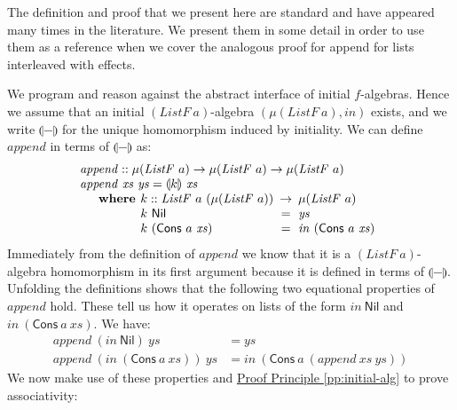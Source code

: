 \documentclass{jfp1}
\newcommand{\fold}[1]{\llparenthesis #1 \rrparenthesis}
\newcommand{\proofprinref}[1]{\hyperref[#1]{Proof Principle \ref*{#1}}}
\newcommand{\kw}[1]{\textbf{#1}}
\begin{document}
The definition and proof that we present here are standard and have
appeared many times in the literature. We present them in some detail
in order to use them as a reference when we cover the analogous proof
for append for lists interleaved with effects.

We program and reason against the abstract interface of initial
$f$-algebras. Hence we assume that an initial
$(\mathit{ListF}~a)$-algebra $(\mu(\mathit{ListF}~a), \mathit{in})$
exists, and we write $\fold{-}$ for the unique homomorphism induced by
initiality. We can define $\mathit{append}$ in terms of $\fold{-}$ as:
\begin{displaymath}
  \begin{array}{l}
    \mathit{append} :: \mu(\mathit{ListF}~a) \to \mu(\mathit{ListF}~a) \to \mu(\mathit{ListF}~a) \\
    \mathit{append}~\mathit{xs}~\mathit{ys} = \fold{k}~\mathit{xs} \\
    \quad\begin{array}{r@{\hspace{0.4em}}l@{\hspace{0.5em}}c@{\hspace{0.5em}}l}
      \kw{where} & k :: \mathit{ListF}~a~(\mu(\mathit{ListF}~a)) &\to& \mu(\mathit{ListF}~a) \\
      & k~\mathsf{Nil} &=& \mathit{ys} \\
      & k~(\mathsf{Cons}~a~\mathit{xs}) &=& \mathit{in}~(\mathsf{Cons}~a~\mathit{xs})
    \end{array}
  \end{array}
\end{displaymath}
Immediately from the definition of $\mathit{append}$ we know that it
is a $(\mathit{ListF}~a)$-algebra homomorphism in its first argument
because it is defined in terms of $\fold{-}$. Unfolding the
definitions shows that the following two equational properties of
$\mathit{append}$ hold. These tell us how it operates on lists of the
form $\mathit{in}~\mathsf{Nil}$ and
$\mathit{in}~(\mathsf{Cons}~a~\mathit{xs})$. We have:
\begin{align}
  \label{eq:append-nil}
  \mathit{append}~(\mathit{in}~\mathsf{Nil})~\mathit{ys} & = \mathit{ys} \\
  \label{eq:append-cons}
  \mathit{append}~(\mathit{in}~(\mathsf{Cons}~a~\mathit{xs}))~\mathit{ys} & = \mathit{in}~(\mathsf{Cons}~a~(\mathit{append}~\mathit{xs}~\mathit{ys}))
\end{align}
We now make use of these properties and \proofprinref{pp:initial-alg}
to prove associativity:
\end{document}
